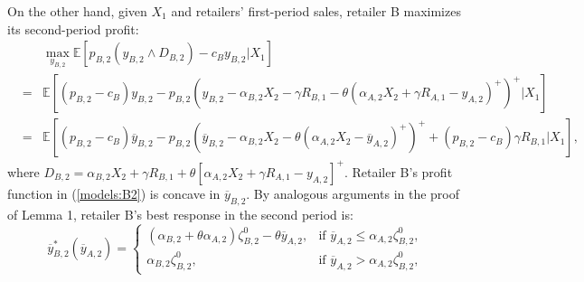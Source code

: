 \documentclass[nonblindrev,copyedit]{informs1}
\begin{document}
\begin{APPENDICES}
On the other hand, given $X_1$ and retailers' first-period sales, retailer B maximizes its second-period profit:
\begin{eqnarray}
    & & \max_{y_{B,2}} \mathbb{E}\left[ p_{B,2}(y_{B,2} \wedge D_{B,2}) - c_B y_{B,2}|X_1  \right] \nonumber \\
    & = & \mathbb{E} \left[ (p_{B,2} -c_B)y_{B,2} - p_{B,2} \left(y_{B,2} - \alpha_{B,2} X_2 - \gamma R_{B,1} - \theta \left(\alpha_{A,2} X_2 + \gamma R_{A,1}- y_{A,2} \right)^+ \right )^+  \bigg| X_1  \right] \nonumber \\[4pt]
    & = & \mathbb{E} \left[ (p_{B,2} -c_B)\overline{y}_{B,2} - p_{B,2} \left(\overline{y}_{B,2} - \alpha_{B,2} X_2  - \theta \left(\alpha_{A,2} X_2 - \overline{y}_{A,2} \right)^+ \right )^+ + (p_{B,2} -c_B)\gamma R_{B,1} \bigg| X_1  \right],  \label{models:B2}
\end{eqnarray}
where $D_{B,2} = \alpha_{B,2} X_2 + \gamma R_{B,1} + \theta \left[\alpha_{A,2} X_2 + \gamma R_{A,1} - y_{A,2} \right]^+$. Retailer B's profit function in (\ref{models:B2}) is concave in $\overline{y}_{B,2}$. By analogous arguments in the proof of Lemma 1, retailer B's best response in the second period is:
\begin{equation}  \label{models:BRB2}
    \overline{y}^*_{B,2}(\overline{y}_{A,2}) =  \begin{cases}
        (\alpha_{B,2} + \theta \alpha_{A,2}) \zeta^0_{B,2} - \theta \overline{y}_{A,2}, &  \text{if $\overline{y}_{A,2} \leq \alpha_{A,2} \zeta^0_{B,2}$,} \\
        \alpha_{B,2} \zeta^0_{B,2}, &  \text{if $\overline{y}_{A,2} > \alpha_{A,2} \zeta^0_{B,2}$,}
    \end{cases}
\end{equation}


\end{APPENDICES}
\end{document}
